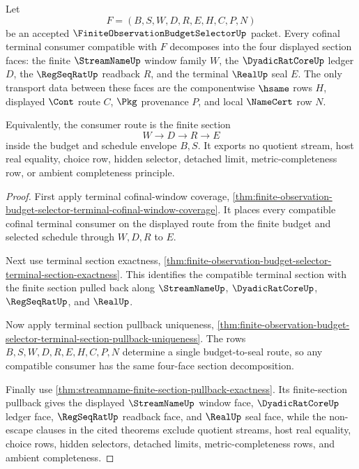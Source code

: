\begin{theorem}
\label{thm:finite-observation-budget-selector-terminal-cofinal-window-section-decomposition}
Let
$$
F=(B,S,W,D,R,E,H,C,P,N)
$$
be an accepted $\FiniteObservationBudgetSelectorUp$ packet. Every cofinal terminal consumer compatible with $F$ decomposes into the four displayed section faces: the finite $\StreamNameUp$ window family $W$, the $\DyadicRatCoreUp$ ledger $D$, the $\RegSeqRatUp$ readback $R$, and the terminal $\RealUp$ seal $E$. The only transport data between these faces are the componentwise $\hsame$ rows $H$, displayed $\Cont$ route $C$, $\Pkg$ provenance $P$, and local $\NameCert$ row $N$.

Equivalently, the consumer route is the finite section
$$
W \to D \to R \to E
$$
inside the budget and schedule envelope $B,S$. It exports no quotient stream, host real equality, choice row, hidden selector, detached limit, metric-completeness row, or ambient completeness principle.
\end{theorem}
\begin{proof}
First apply terminal cofinal-window coverage, \autoref{thm:finite-observation-budget-selector-terminal-cofinal-window-coverage}. It places every compatible cofinal terminal consumer on the displayed route from the finite budget and selected schedule through $W,D,R$ to $E$.

Next use terminal section exactness, \autoref{thm:finite-observation-budget-selector-terminal-section-exactness}. This identifies the compatible terminal section with the finite section pulled back along $\StreamNameUp$, $\DyadicRatCoreUp$, $\RegSeqRatUp$, and $\RealUp$.

Now apply terminal section pullback uniqueness, \autoref{thm:finite-observation-budget-selector-terminal-section-pullback-uniqueness}. The rows $B,S,W,D,R,E,H,C,P,N$ determine a single budget-to-seal route, so any compatible consumer has the same four-face section decomposition.

Finally use \autoref{thm:streamname-finite-section-pullback-exactness}. Its finite-section pullback gives the displayed $\StreamNameUp$ window face, $\DyadicRatCoreUp$ ledger face, $\RegSeqRatUp$ readback face, and $\RealUp$ seal face, while the non-escape clauses in the cited theorems exclude quotient streams, host real equality, choice rows, hidden selectors, detached limits, metric-completeness rows, and ambient completeness.
\end{proof}

